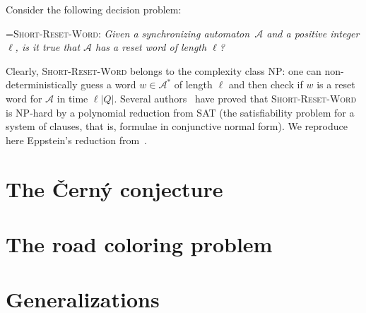 \documentclass{irmaart}
\newcommand\A{\mathcal{A}}
\newcommand{\san}{synchronizing au\-tom\-a\-ton}
\begin{document}
Consider the following decision problem:

\smallskip

\hangindent=\parindent \noindent\textsc{Short-Reset-Word:}
\emph{Given a \san\ $\mathcal{A}$ and a positive integer $\ell$,
is it true that $\mathcal{A}$ has a reset word of length $\ell$?}

\smallskip

Clearly, \textsc{Short-Reset-Word} belongs to the complexity class
\textsf{NP}: one can non-deterministically guess a word $w\in\A^*$
of length $\ell$ and then check if $w$ is a reset word for
$\mathcal{A}$ in time $\ell|Q|$. Several
authors~\cite{Rystsov:1980,Eppstein:1990,Goralcik&Koubek:1995,Salomaa:2003,Samotij:2007}
have proved that \textsc{Short-Reset-Word} is \textsf{NP}-hard by
a polynomial reduction from \textsc{SAT} (the satisfiability
problem for a system of clauses, that is, formulae in conjunctive
normal form). We reproduce here Eppstein's reduction
from~\cite{Eppstein:1990}.

\section{The \v{C}ern\'{y} conjecture}

\section{The road coloring problem}

\section{Generalizations}


\begin{footnotesize}
  
\end{footnotesize}


\markright{\indexname}\markboth{\indexname}{\indexname}
\printindex
\end{document}
